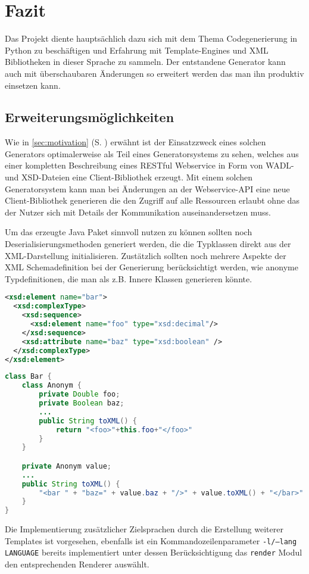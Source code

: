 \section{Fazit}
\label{sec:conclusion}

Das Projekt diente hauptsächlich dazu sich mit dem Thema Codegenerierung in Python zu beschäftigen und Erfahrung mit Template-Engines und XML Bibliotheken in dieser Sprache zu sammeln. Der entstandene Generator kann auch mit überschaubaren Änderungen so erweitert werden das man ihn produktiv einsetzen kann.

\subsection{Erweiterungsmöglichkeiten}
\label{sec:extension}

Wie in \cref{sec:motivation} (S. \pageref{sec:motivation}) erwähnt ist der Einsatzzweck eines solchen Generators optimalerweise als Teil eines Generatorsystems zu sehen, welches aus einer kompletten Beschreibung eines \gls{RESTful} Webservice in Form von \gls{WADL}- und \gls{XSD}-Dateien eine Client-Bibliothek erzeugt. Mit einem solchen Generatorsystem kann man bei Änderungen an der Webservice-API eine neue Client-Bibliothek generieren die den Zugriff auf alle Ressourcen erlaubt ohne das der Nutzer sich mit Details der Kommunikation auseinandersetzen muss. %

Um das erzeugte Java Paket sinnvoll nutzen zu können sollten noch Deserialisierungsmethoden generiert werden, die die Typklassen direkt aus der XML-Darstellung initialisieren. Zustätzlich sollten noch mehrere Aspekte der XML Schemadefinition bei der Generierung berücksichtigt werden, wie anonyme Typdefinitionen, die man als z.B. Innere Klassen generieren könnte.

\begin{lstlisting}[language=XML]
<xsd:element name="bar">
  <xsd:complexType>
    <xsd:sequence>
      <xsd:element name="foo" type="xsd:decimal"/>
    </xsd:sequence>
    <xsd:attribute name="baz" type="xsd:boolean" />
  </xsd:complexType>
</xsd:element>
\end{lstlisting}

\begin{lstlisting}[language=Java]
class Bar {
    class Anonym {
        private Double foo;
        private Boolean baz;
        ...
        public String toXML() {
            return "<foo>"+this.foo+"</foo>"
        }
    }

    private Anonym value;
    ...
    public String toXML() {
        "<bar " + "baz=" + value.baz + "/>" + value.toXML() + "</bar>"
    }
}
\end{lstlisting}

Die Implementierung zusätzlicher Zielsprachen durch die Erstellung weiterer Templates ist vorgesehen, ebenfalls ist ein Kommandozeilenparameter \texttt{-l/--lang LANGUAGE} bereits implementiert unter dessen Berücksichtigung das \texttt{render} Modul den entsprechenden Renderer auswählt.
